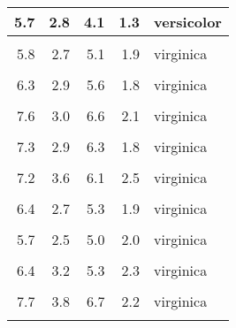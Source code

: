 \documentclass[
]{article}
\begin{document}
\begin{table}
\begin{tabular}[t]{r|r|r|r|l}
\hline
5.7 & 2.8 & 4.1 & 1.3 & versicolor\\
\hline
\cellcolor{gray!6}{6.3} & \cellcolor{gray!6}{3.3} & \cellcolor{gray!6}{6.0} & \cellcolor{gray!6}{2.5} & \cellcolor{gray!6}{virginica}\\
\hline
5.8 & 2.7 & 5.1 & 1.9 & \vphantom{1} virginica\\
\hline
\cellcolor{gray!6}{7.1} & \cellcolor{gray!6}{3.0} & \cellcolor{gray!6}{5.9} & \cellcolor{gray!6}{2.1} & \cellcolor{gray!6}{virginica}\\
\hline
6.3 & 2.9 & 5.6 & 1.8 & virginica\\
\hline
\cellcolor{gray!6}{6.5} & \cellcolor{gray!6}{3.0} & \cellcolor{gray!6}{5.8} & \cellcolor{gray!6}{2.2} & \cellcolor{gray!6}{virginica}\\
\hline
7.6 & 3.0 & 6.6 & 2.1 & virginica\\
\hline
\cellcolor{gray!6}{4.9} & \cellcolor{gray!6}{2.5} & \cellcolor{gray!6}{4.5} & \cellcolor{gray!6}{1.7} & \cellcolor{gray!6}{virginica}\\
\hline
7.3 & 2.9 & 6.3 & 1.8 & virginica\\
\hline
\cellcolor{gray!6}{6.7} & \cellcolor{gray!6}{2.5} & \cellcolor{gray!6}{5.8} & \cellcolor{gray!6}{1.8} & \cellcolor{gray!6}{virginica}\\
\hline
7.2 & 3.6 & 6.1 & 2.5 & virginica\\
\hline
\cellcolor{gray!6}{6.5} & \cellcolor{gray!6}{3.2} & \cellcolor{gray!6}{5.1} & \cellcolor{gray!6}{2.0} & \cellcolor{gray!6}{virginica}\\
\hline
6.4 & 2.7 & 5.3 & 1.9 & virginica\\
\hline
\cellcolor{gray!6}{6.8} & \cellcolor{gray!6}{3.0} & \cellcolor{gray!6}{5.5} & \cellcolor{gray!6}{2.1} & \cellcolor{gray!6}{virginica}\\
\hline
5.7 & 2.5 & 5.0 & 2.0 & virginica\\
\hline
\cellcolor{gray!6}{5.8} & \cellcolor{gray!6}{2.8} & \cellcolor{gray!6}{5.1} & \cellcolor{gray!6}{2.4} & \cellcolor{gray!6}{virginica}\\
\hline
6.4 & 3.2 & 5.3 & 2.3 & virginica\\
\hline
\cellcolor{gray!6}{6.5} & \cellcolor{gray!6}{3.0} & \cellcolor{gray!6}{5.5} & \cellcolor{gray!6}{1.8} & \cellcolor{gray!6}{virginica}\\
\hline
7.7 & 3.8 & 6.7 & 2.2 & virginica\\
\hline
\cellcolor{gray!6}{7.7} & \cellcolor{gray!6}{2.6} & \cellcolor{gray!6}{6.9} & \cellcolor{gray!6}{2.3} & \cellcolor{gray!6}{virginica}\\

\end{tabular}
\end{table}
\end{document}
